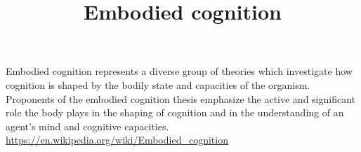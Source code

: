 \documentclass[a4paper]{article}
\title{Embodied cognition}
\date{}
\begin{document}
    \maketitle
    
    Embodied cognition represents a diverse group of theories which investigate how cognition is shaped by the bodily state and capacities of the organism. Proponents of the embodied cognition thesis emphasize the active and significant role the body plays in the shaping of cognition and in the understanding of an agent's mind and cognitive capacities.
    \url{https://en.wikipedia.org/wiki/Embodied_cognition}
    
\end{document}
